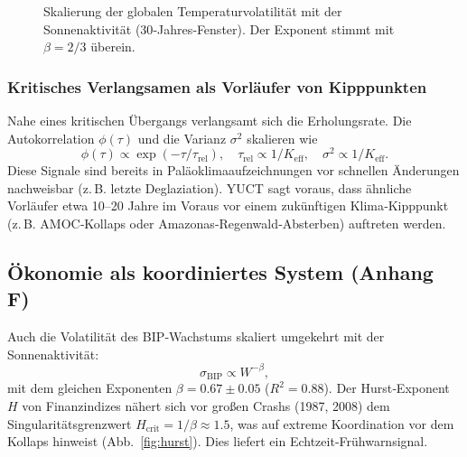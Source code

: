 \documentclass[12pt,a4paper]{article}
\newcommand{\Keff}{K_{\mathrm{eff}}}
\begin{document}
	\begin{figure}[H]
		\centering
		\caption{Skalierung der globalen Temperaturvolatilität mit der Sonnenaktivität (30‑Jahres‑Fenster).
			Der Exponent stimmt mit $\beta = 2/3$ überein.}
		\label{fig:climate_scaling}
	\end{figure}
	
	\subsubsection{Kritisches Verlangsamen als Vorläufer von Kipppunkten}
	
	Nahe eines kritischen Übergangs verlangsamt sich die Erholungsrate. Die Autokorrelation
	$\phi(\tau)$ und die Varianz $\sigma^2$ skalieren wie
	\[
	\phi(\tau) \propto \exp(-\tau/\tau_{\text{rel}}),\quad
	\tau_{\text{rel}} \propto 1/\Keff,\quad
	\sigma^2 \propto 1/\Keff.
	\]
	Diese Signale sind bereits in Paläoklimaaufzeichnungen vor schnellen Änderungen nachweisbar
	(z. B. letzte Deglaziation). YUCT sagt voraus, dass ähnliche Vorläufer etwa 10–20 Jahre im Voraus
	vor einem zukünftigen Klima‑Kipppunkt (z. B. AMOC‑Kollaps oder Amazonas‑Regenwald‑Absterben)
	auftreten werden.
	
	\subsection{Ökonomie als koordiniertes System (Anhang F)}
	
	Auch die Volatilität des BIP‑Wachstums skaliert umgekehrt mit der Sonnenaktivität:
	\[
	\sigma_{\text{BIP}} \propto W^{-\beta},
	\]
	mit dem gleichen Exponenten $\beta = 0.67 \pm 0.05$ ($R^2 = 0.88$). Der Hurst‑Exponent
	$H$ von Finanzindizes nähert sich vor großen Crashs (1987, 2008) dem Singularitätsgrenzwert
	$H_{\text{crit}} = 1/\beta \approx 1.5$, was auf extreme Koordination vor dem Kollaps hinweist
	(Abb.~\ref{fig:hurst}). Dies liefert ein Echtzeit‑Frühwarnsignal.
	
\end{document}
